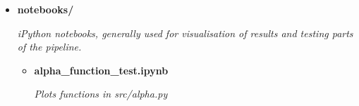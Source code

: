 {\begin{itemize}
\begin{itemize}
                \item {\bf alpha.py }
                \begin{sloppypar} \textit{Defines the transfer functions shown in section \ref{sec:autoalpha} }\end{sloppypar}
                \item {\bf disfa.py }
                \begin{sloppypar} \textit{Defines a class which on construction loads and preprocesses DISFA data}\end{sloppypar}
                \item {\bf expman.py }
                \begin{sloppypar} \textit{Manages configuration files and data storage directories.}\end{sloppypar}
                \item {\bf helper.py }
                \begin{sloppypar} \textit{Miscallaneous helper functions used throughout}\end{sloppypar}
                \item {\bf metric.py }
                \begin{sloppypar} \textit{Implements the techniques described in section \ref{sec:eval} }\end{sloppypar}
                \item {\bf model.py }
                \begin{sloppypar} \textit{Defines a tensorflow graph describing the neural networks used in this project.}\end{sloppypar}
                \item {\bf test\_set\_analysis.py }
                \begin{sloppypar} \textit{Runs the test set through a fully trained model and saves results. Is used in main.py and can be used on its own.}\end{sloppypar}
              \end{itemize}
      \item   {\bf notebooks/ }
              \begin{sloppypar} \textit{iPython notebooks, generally used for visualisation of results and testing parts of the pipeline.}\end{sloppypar}
              \begin{itemize}
                \item {\bf alpha\_function\_test.ipynb }
                \begin{sloppypar} \textit{Plots functions in src/alpha.py}\end{sloppypar}

\end{itemize}
\end{itemize}}
